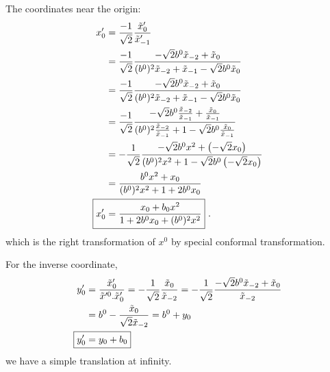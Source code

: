 \documentclass[aps,reprint,notitlepage,nofootinbib,superscriptaddress]{revtex4-1}
\begin{document}
 The coordinates near the origin:
 \begin{align}
     x_0'&=\frac{-1}{\sqrt{2}}\frac{\tilde{x}_{0}'}{ \tilde{x}_{-1}'}\\
     &=\frac{-1}{\sqrt{2}}\frac{-\sqrt{2}b^0\tilde{x}_{-2}+\tilde{x}_{0}}{ (b^0)^2\tilde{x}_{-2}+\tilde{x}_{-1}-\sqrt{2}b^0\tilde{x}_{0}}\\
    &=\frac{-1}{\sqrt{2}}\frac{-\sqrt{2} b^0\tilde{x}_{-2}+\tilde{x}_{0}}{ (b^0)^2\tilde{x}_{-2}+\tilde{x}_{-1}-\sqrt{2}b^0\tilde{x}_{0}}\\
    &=\frac{-1}{\sqrt{2}}\frac{-\sqrt{2}b^0\frac{\tilde{x}_{-2}}{\tilde{x}_{-1}}+\frac{\tilde{x}_{0}}{\tilde{x}_{-1}}}{ (b^0)^2\frac{\tilde{x}_{-2}}{\tilde{x}_{-1}}+1-\sqrt{2}b^0\frac{\tilde{x}_{0}}{\tilde{x}_{-1}}}\\
    &=-\frac{1}{\sqrt{2}}\frac{-\sqrt{2}b^0x^2+\left(-\sqrt{2}x_0\right)}{ (b^0)^2x^2+1-\sqrt{2}b^0\left(-\sqrt{2}x_0\right)}\\
    &=\frac{b^0x^2+x_0}{ (b^0)^2x^2+1+2b^0x_0}\\
     \Aboxed{x'_0&=\frac{x_0+b_0x^2}{1+2b^0x_0+(b^0)^2x^2}}~.
 \end{align}
 which is the right transformation of $x^0$ by special conformal transformation.
 
 
For the inverse coordinate,
\begin{align}
    y'_0&=\frac{\tilde{x}'_0}{\tilde{x}'^0.\tilde{x}'_0}=-\frac{1}{\sqrt{2}}\frac{\tilde{x}_{0}}{\tilde{x}_{-2}}=-\frac{1}{\sqrt{2}}\frac{-\sqrt{2}b^0\tilde{x}_{-2}+\tilde{x}_{0}}{\tilde{x}_{-2}}\\
    &=b^0-\frac{\tilde{x}_{0}}{\sqrt{2}\tilde{x}_{-2}}=b^0+y_0\\
    \Aboxed{y'_0&=y_0+b_0}
\end{align}
we have a simple translation at infinity. 
  



\end{document}

